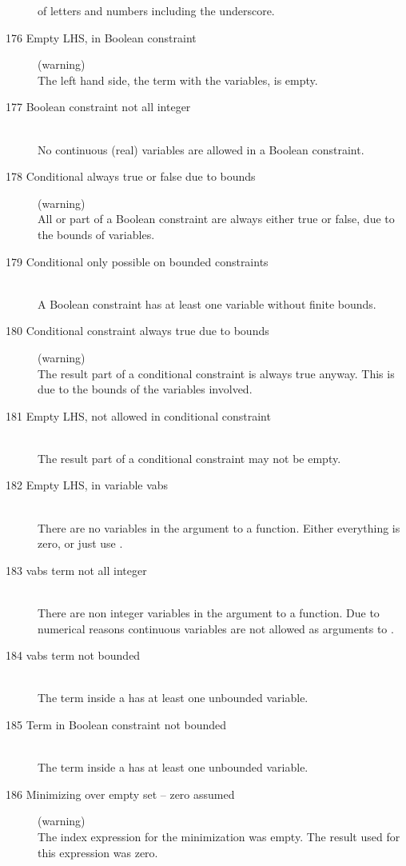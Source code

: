 \begin{description}
  of letters and numbers including the underscore. 
%
%
\item[176 Empty LHS, in Boolean constraint] (warning)\ \\
   The left hand side, \ie the term with the variables, is empty. 
\item[177 Boolean constraint not all integer]\ \\
   No continuous (real) variables are allowed in a Boolean constraint.
\item[178 Conditional always true or false due to bounds] (warning)\ \\
   All or part of a Boolean constraint are always either true or
   false, due to the bounds of variables.
\item[179 Conditional only possible on bounded constraints]\ \\
   A Boolean constraint has at least one variable without finite bounds.
\item[180 Conditional constraint always true due to bounds] (warning)\ \\
   The result part of a conditional constraint is always true anyway. 
   This is due to the bounds of the variables involved.
\item[181 Empty LHS, not allowed in conditional constraint]\ \\
   The result part of a conditional constraint may not be empty.
\item[182 Empty LHS, in variable vabs]\ \\
   There are no variables in the argument to a  function.
   Either everything is zero, or just use .
\item[183 vabs term not all integer]\ \\
   There are non integer variables in the argument to a  function.
   Due to numerical reasons continuous variables are not allowed as
   arguments to . 
\item[184 vabs term not bounded]\ \\
   The term inside a  has at least one unbounded variable.
\item[185 Term in Boolean constraint not bounded]\ \\
   The term inside a  has at least one unbounded variable.
%
%
\item[186 Minimizing over empty set -- zero assumed] (warning)\ \\
   The index expression for the minimization was empty. The result
   used for this expression was zero.

\end{description}
